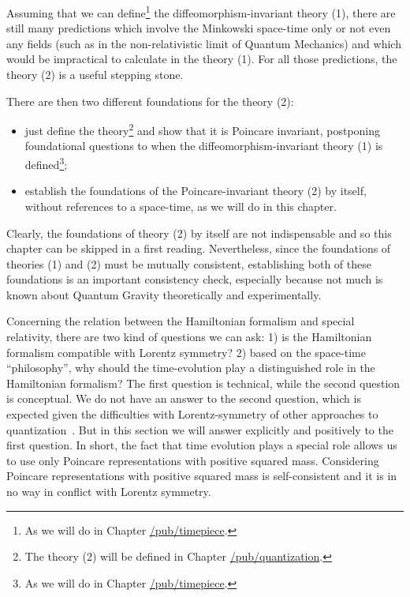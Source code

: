 \documentclass[11pt]{book}
\begin{document}
Assuming that we can define\footnote{As we will do in Chapter
  \href{https://timepiece.pubpub.org/pub/timepiece}{/pub/timepiece}.}
the diffeomorphism-invariant theory (1), there are still many
predictions which involve the Minkowski space-time only or not even any
fields (such as in the non-relativistic limit of Quantum Mechanics) and
which would be impractical to calculate in the theory (1). For all those
predictions, the theory (2) is a useful stepping stone.

There are then two different foundations for the theory (2):

\begin{itemize}
\item
  just define the theory\footnote{The theory (2) will be defined in
    Chapter
    \href{https://timepiece.pubpub.org/pub/quantization}{/pub/quantization}.}
  and show that it is Poincare invariant, postponing foundational
  questions to when the diffeomorphism-invariant theory (1) is
  defined\footnote{As we will do in Chapter
    \href{https://timepiece.pubpub.org/pub/timepiece}{/pub/timepiece}.};
\item
  establish the foundations of the Poincare-invariant theory (2) by
  itself, without references to a space-time, as we will do in this
  chapter.
\end{itemize}

Clearly, the foundations of theory (2) by itself are not indispensable
and so this chapter can be skipped in a first reading. Nevertheless,
since the foundations of theories (1) and (2) must be mutually
consistent, establishing both of these foundations is an important
consistency check, especially because not much is known about Quantum
Gravity theoretically and experimentally.

Concerning the relation between the Hamiltonian formalism and special
relativity, there are two kind of questions we can ask: 1) is the
Hamiltonian formalism compatible with Lorentz symmetry? 2) based on the
space-time ``philosophy'', why should the time-evolution play a
distinguished role in the Hamiltonian formalism? The first question is
technical, while the second question is conceptual. We do not have an
answer to the second question, which is expected given the difficulties
with Lorentz-symmetry of other approaches to
quantization~\cite{Segal1991Is}. But in
this section we will answer explicitly and positively to the first
question. In short, the fact that time evolution plays a special role
allows us to use only Poincare representations with positive squared
mass. Considering Poincare representations with positive squared mass is
self-consistent and it is in no way in conflict with Lorentz symmetry.
\end{document}
